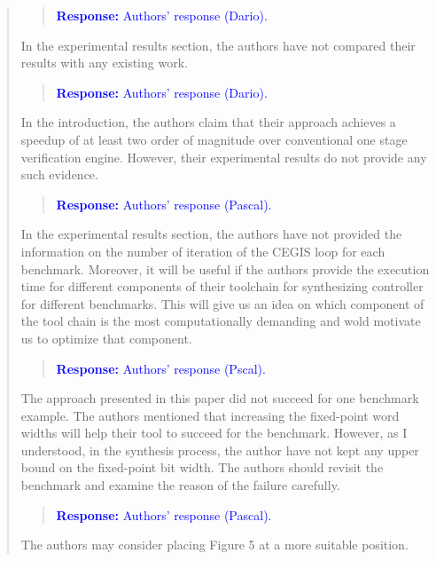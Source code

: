 \documentclass[11pt]{article}
\begin{document}
\begin{quote}
\begin{quote}
\textcolor{blue}{\textbf{Response:} Authors' response (Dario).}
\end{quote}

In the experimental results section, the authors have not compared their results with any existing work. 

\begin{quote}
\textcolor{blue}{\textbf{Response:} Authors' response (Dario).}
\end{quote}

In the introduction, the authors claim that their approach achieves a speedup of at least two order of magnitude over conventional one stage verification engine. However, their experimental results do not provide any such evidence.

\begin{quote}
\textcolor{blue}{\textbf{Response:} Authors' response (Pascal).}
\end{quote}

In the experimental results section, the authors have not provided the information on the number of iteration of the CEGIS loop for each benchmark. Moreover, it will be useful if the authors provide the execution time for different components of their toolchain for synthesizing controller for different benchmarks. This will give us an idea on which component of the tool chain is the most computationally demanding and wold motivate us to optimize that component.

\begin{quote}
\textcolor{blue}{\textbf{Response:} Authors' response (Pscal).}
\end{quote}

The approach presented in this paper did not succeed for one benchmark example. The authors mentioned that increasing the fixed-point word widths will help their tool to succeed for the benchmark. However, as I understood, in the synthesis process, the author have not kept any upper bound on the fixed-point bit width. The authors should revisit the benchmark and examine the reason of the failure carefully.

\begin{quote}
\textcolor{blue}{\textbf{Response:} Authors' response (Pascal).}
\end{quote}

The authors may consider placing Figure 5 at a more suitable position.

\end{quote}
\end{document}
